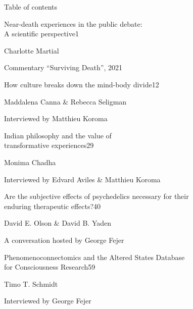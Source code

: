 \AliusIssueBlankPage

\clearpage
\thispagestyle{empty}
\vspace*{2.8cm}
{\AliusLato\fontsize{20}{24}\selectfont Table of contents\par}
\vspace{1.2cm}
{\AliusLatoLight\fontsize{12}{15}\selectfont Near-death experiences in the public debate:\\A scientific perspective\hfill 1\par}
{\AliusLatoLight\fontsize{12}{15}\selectfont Charlotte Martial\par}
{\AliusLatoLight\fontsize{12}{15}\selectfont Commentary ``Surviving Death'', 2021\par}
\vspace{1.0em}
{\AliusLatoLight\fontsize{12}{15}\selectfont How culture breaks down the mind-body divide\hfill 12\par}
{\AliusLatoLight\fontsize{12}{15}\selectfont Maddalena Canna \& Rebecca Seligman\par}
{\AliusLatoLight\fontsize{12}{15}\selectfont Interviewed by Matthieu Koroma\par}
\vspace{1.0em}
{\AliusLatoLight\fontsize{12}{15}\selectfont Indian philosophy and the value of\\transformative experiences\hfill 29\par}
{\AliusLatoLight\fontsize{12}{15}\selectfont Monima Chadha\par}
{\AliusLatoLight\fontsize{12}{15}\selectfont Interviewed by Edvard Aviles \& Matthieu Koroma\par}
\vspace{1.0em}
{\AliusLatoLight\fontsize{12}{15}\selectfont Are the subjective effects of psychedelics necessary for their\\enduring therapeutic effects?\hfill 40\par}
{\AliusLatoLight\fontsize{12}{15}\selectfont David E. Olson \& David B. Yaden\par}
{\AliusLatoLight\fontsize{12}{15}\selectfont A conversation hosted by George Fejer\par}
\vspace{1.0em}
{\AliusLatoLight\fontsize{12}{15}\selectfont Phenomenoconnectomics and the Altered States Database\\for Consciousness Research\hfill 59\par}
{\AliusLatoLight\fontsize{12}{15}\selectfont Timo T. Schmidt\par}
{\AliusLatoLight\fontsize{12}{15}\selectfont Interviewed by George Fejer\par}
\clearpage

\AliusIssueBlankPage
